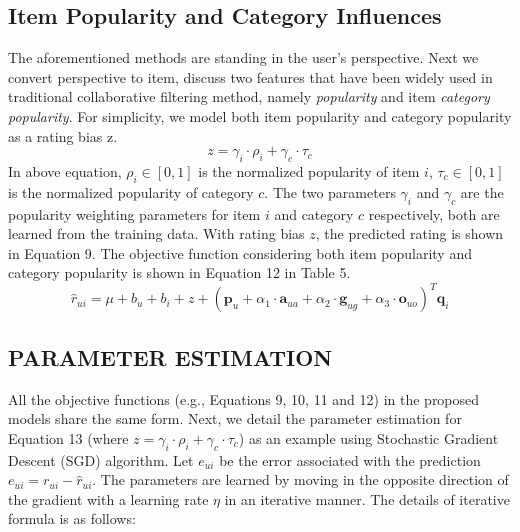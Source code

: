 \documentclass{llncs}
\begin{document}
	\subsection{Item  Popularity and Category Influences}
	The aforementioned methods are standing in the user's perspective.
	Next we convert perspective to item, discuss two features that have been widely used in traditional collaborative filtering method,
	namely \textsl{popularity} and item \textsl{category popularity}.
	For simplicity, we model both item popularity and category popularity as a rating bias z.
	\begin{equation}\label{7}
		z=\gamma_i\cdot\rho_i+\gamma_c\cdot \tau_c
	\end{equation}
	In above equation, $\rho_i\in[0,1]$ is the normalized popularity of item $i$,
	$\tau_c\in[0,1]$ is the normalized  popularity of category $c$. The two parameters
	$\gamma_i$ and $\gamma_c$ are the popularity weighting parameters for item $i$ and category $c$ respectively,
	both are learned from the training data. With rating
	bias $z$, the predicted rating is shown in Equation 9.
	The objective function considering both item popularity
	and category popularity is shown in Equation 12 in Table 5.
	\begin{equation}\label{8}
		\hat{r}_{ui}=\mu+b_u+b_i+z+(\mathbf{p}_u+\alpha_1\cdot \mathbf{a}_{ua}+\alpha_2\cdot \mathbf{g}_{ug}+\alpha_3\cdot \mathbf{o}_{uo})^T\mathbf{q}_i
	\end{equation}
	
	
	\subsection{PARAMETER ESTIMATION}
	All the objective functions (e.g., Equations 9, 10, 11 and 12) in the
	proposed models share the same form.
	Next, we detail the parameter estimation for Equation 13 (where
	$z=\gamma_i\cdot\rho_i+\gamma_c\cdot \tau_c$) as an
	example using Stochastic Gradient Descent (SGD) algorithm\cite{4-1-1}.
	Let $e_{ui}$ be the error associated with the prediction $e_{ui}= r_{ui}-\hat {r}_{ui}$.
	The parameters are learned by moving in the opposite direction of
	the gradient with a learning rate $\eta$ in an iterative manner.
	The details of iterative formula is as follows:
	
\end{document}

